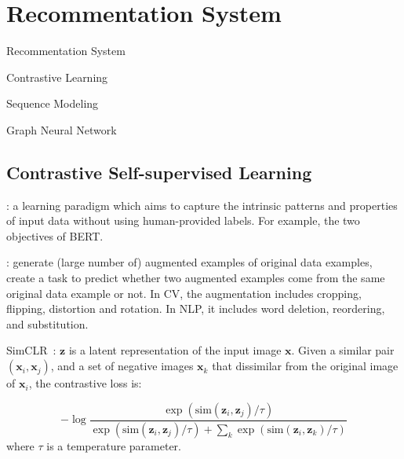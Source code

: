 \chapter{Recommentation System}\label{sec:rs}


\begin{learningobjectives}
	\item Recommentation System
	\item Contrastive Learning
	\item Sequence Modeling
	\item Graph Neural Network
\end{learningobjectives}


\section{Contrastive Self-supervised Learning}

: a learning paradigm which aims to capture the intrinsic patterns and properties of input
data without using human-provided labels. For example, the two objectives of BERT.

: generate (large number of) augmented examples of original data examples, create a task to predict whether two augmented examples come from the same original data example or not.
In CV, the augmentation includes cropping, flipping, distortion and rotation.
In NLP, it includes word deletion, reordering, and substitution.

SimCLR~: $\boldsymbol{z}$ is a latent representation of the input image $\boldsymbol{x}$. Given a similar pair $(\boldsymbol{x}_i, \boldsymbol{x}_j)$, and a set of negative images $\boldsymbol{x}_k$ that dissimilar from the original image of $\boldsymbol{x}_i$, the contrastive loss is:

\begin{equation} \label{eq:simclr}
	- \log \frac{\exp(\text{sim}(\boldsymbol{z}_i, \boldsymbol{z}_j)/\tau)}{\exp(\text{sim}(\boldsymbol{z}_i, \boldsymbol{z}_j)/\tau) + \sum_k \exp(\text{sim}(\boldsymbol{z}_i, \boldsymbol{z}_k)/\tau)}
\end{equation}
where $\tau$ is a temperature parameter.


